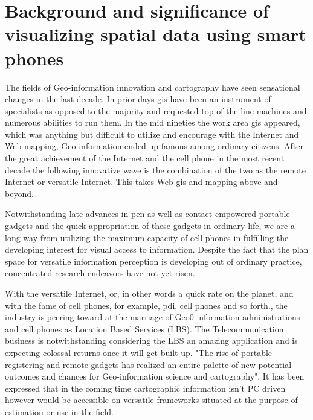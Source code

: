 \section{Background and significance of visualizing spatial data using smart phones}

The fields of Geo-information innovation and cartography have seen sensational changes in the last decade. In prior days \gls{gis} have been an instrument of specialists as opposed to the majority and requested top of the line machines and numerous abilities to run them. In the mid nineties the work area \gls{gis} appeared, which was anything but difficult to utilize and encourage with the Internet and Web mapping, Geo-information ended up famous among ordinary citizens. After the great achievement of the Internet and the cell phone in the most recent decade the following innovative wave is the combination of the two as the remote Internet or versatile Internet. This takes Web \gls{gis} and mapping above and beyond. 

Notwithstanding late advances in pen-as well as contact empowered portable gadgets and the quick appropriation of these gadgets in ordinary life, we are a long way from utilizing the maximum capacity of cell phones in fulfilling the developing interest for visual access to information. Despite the fact that the plan space for versatile  information perception is developing out of ordinary practice, concentrated research endeavors have not yet risen.

With the versatile Internet, or, in other words a quick rate on the planet, and with the fame of cell phones, for example, \gls{pdi}, cell phones and so forth., the industry is peering toward at the marriage of Geo0-information administrations and cell phones as Location Based Services (LBS). The Telecommunication business is notwithstanding considering the LBS an amazing application and is expecting colossal returns once it will get built up. "The rise of portable registering and remote gadgets has realized an entire palette of new potential outcomes and chances for Geo-information science and cartography". It has been expressed that in the coming time cartographic information isn't PC driven however would be accessible on versatile frameworks situated at the purpose of estimation or use in the field.

